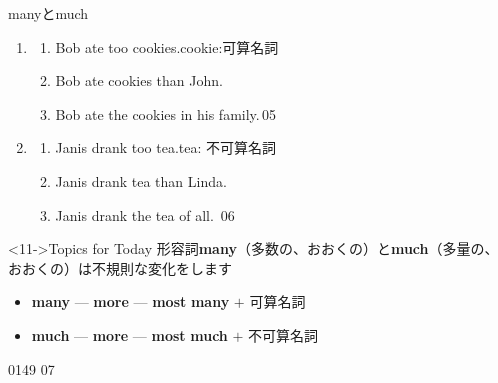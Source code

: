\documentclass[aspectratio=169,xcolor={dvipsnames,table}]{beamer}
\begin{document}
\begin{frame}[plain]{manyとmuch}
 \begin{enumerate}
  \item \begin{enumerate}
	 \item<1-> Bob ate too  cookies.\hfill{\scriptsize cookie:可算名詞}
	 \item<2-> Bob ate  cookies than John.
	 \item<4-> Bob ate the  cookies in his family.\hfill{\scriptsize {}\,05}

	\end{enumerate}
  \item \begin{enumerate}
	 \item<6-> Janis drank too  tea.\hfill{\scriptsize tea: 不可算名詞}
	 \item<7-> Janis drank  tea than Linda.
	 \item<9-> Janis drank the  tea of all.%
\hfill{\scriptsize {}\,06}


	\end{enumerate}
 \end{enumerate}
%
\begin{block}<11->{Topics for Today}\small
形容詞{\bfseries many}（多数の、おおくの）と{\bfseries much}（多量の、おおくの）は不規則な変化をします%

\begin{itemize}[square]\small
 \item {\bfseries many}  --- {\bfseries more}   --- {\bfseries most}  \hfill{}\textbf{many} $+$ 可算名詞 
 \item {\bfseries much}   --- {\bfseries more}   --- {\bfseries most}   \hfill{}\textbf{much} $+$ 不可算名詞 
 \end{itemize}
     \end{block}
\hfill{\tiny 0149}\,{\scriptsize {}\,07}

\end{frame}
\end{document}
